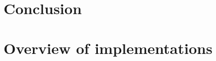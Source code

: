 \documentclass[fancyheadings,11pt]{book}
\begin{document}
\chapter{Conclusion}
\label{conclusion}
\noindent


\appendix
\chapter{Overview of implementations}
\label{sect:appendix}

\backmatter


%



\end{document}
